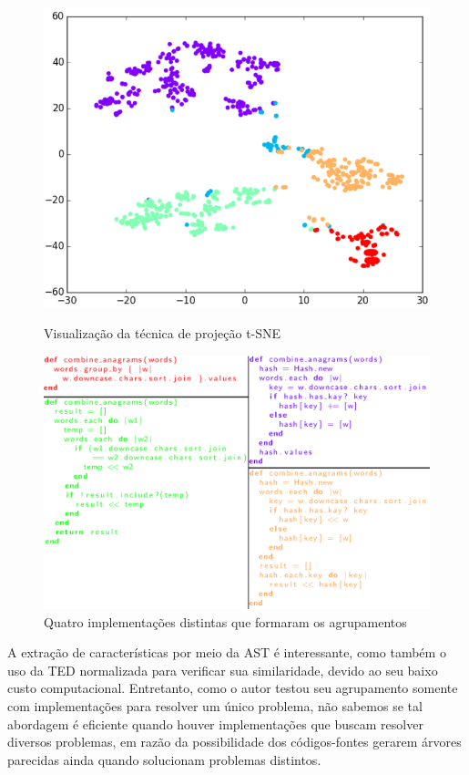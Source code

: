 		
		\begin{figure}[b]
			\centering
			\includegraphics[scale=0.5]{imagem/visualizacao-tSNE.png}
			\caption[Visualização da técnica de projeção t-SNE]{Visualização da técnica de projeção t-SNE \cite{Yin:2015}}
			\label{fig:t-SNE}

			\vspace{.5cm}

			\centering
			\includegraphics[width=0.7\linewidth]{imagem/implementacoesYin}
			\caption[Quatro implementações distintas que formaram os agrupamentos]{Quatro implementações distintas que formaram os agrupamentos \cite{Yin:2015}}
			\label{fig:implementacoesYin}
		\end{figure}

		A extração de características por meio da \acs{AST} é interessante, como também
		o uso da \acs{TED} normalizada para verificar sua similaridade, devido ao seu
		baixo custo computacional. Entretanto, como o autor testou seu agrupamento
		somente com implementações para resolver um único problema, não sabemos se
		tal abordagem é eficiente quando houver implementações que buscam resolver
		diversos problemas, em razão da possibilidade dos códigos-fontes gerarem
		árvores parecidas ainda quando solucionam problemas distintos.
		
